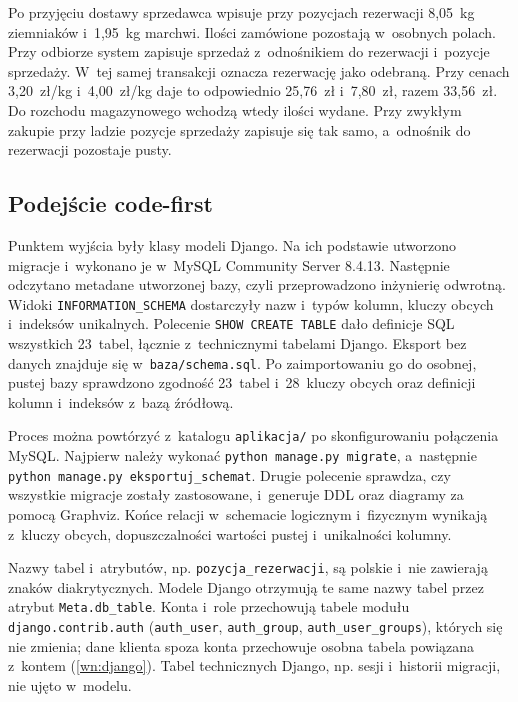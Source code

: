 \documentclass[12pt,a4paper,oneside]{article}
\newcounter{pu}
\begin{document}
Po przyjęciu dostawy sprzedawca wpisuje przy pozycjach rezerwacji 8,05~kg ziemniaków i~1,95~kg marchwi. Ilości zamówione pozostają w~osobnych polach. Przy odbiorze system zapisuje sprzedaż z~odnośnikiem do rezerwacji i~pozycje sprzedaży. W~tej samej transakcji oznacza rezerwację jako odebraną. Przy cenach 3,20~zł/kg i~4,00~zł/kg daje to odpowiednio 25,76~zł i~7,80~zł, razem 33,56~zł. Do rozchodu magazynowego wchodzą wtedy ilości wydane. Przy zwykłym zakupie przy ladzie pozycje sprzedaży zapisuje się tak samo, a~odnośnik do rezerwacji pozostaje pusty.

\subsection{Podejście code-first}
\label{sec:code-first}

Punktem wyjścia były klasy modeli Django. Na ich podstawie utworzono migracje i~wykonano je w~MySQL Community Server 8.4.13. Następnie odczytano metadane utworzonej bazy, czyli przeprowadzono inżynierię odwrotną. Widoki \texttt{INFORMATION\_SCHEMA} dostarczyły nazw i~typów kolumn, kluczy obcych i~indeksów unikalnych. Polecenie \texttt{SHOW CREATE TABLE} dało definicje SQL wszystkich 23~tabel, łącznie z~technicznymi tabelami Django. Eksport bez danych znajduje się w~\texttt{baza/schema.sql}. Po zaimportowaniu go do osobnej, pustej bazy sprawdzono zgodność 23~tabel i~28~kluczy obcych oraz definicji kolumn i~indeksów z~bazą źródłową.

Proces można powtórzyć z~katalogu \texttt{aplikacja/} po skonfigurowaniu połączenia MySQL. Najpierw należy wykonać \texttt{python manage.py migrate}, a~następnie \texttt{python manage.py eksportuj\_schemat}. Drugie polecenie sprawdza, czy wszystkie migracje zostały zastosowane, i~generuje DDL oraz diagramy za pomocą Graphviz. Końce relacji w~schemacie logicznym i~fizycznym wynikają z~kluczy obcych, dopuszczalności wartości pustej i~unikalności kolumny.

Nazwy tabel i~atrybutów, np. \texttt{pozycja\_\allowbreak{}rezerwacji}, są polskie i~nie zawierają znaków diakrytycznych. Modele Django otrzymują te same nazwy tabel przez atrybut \texttt{Meta.\allowbreak{}db\_\allowbreak{}table}. Konta i~role przechowują tabele modułu \texttt{django.\allowbreak contrib.\allowbreak auth} (\texttt{auth\_\allowbreak{}user}, \texttt{auth\_\allowbreak{}group}, \texttt{auth\_\allowbreak{}user\_\allowbreak{}groups}), których się nie zmienia; dane klienta spoza konta przechowuje osobna tabela powiązana z~kontem (\ref{wn:django}). Tabel technicznych Django, np. sesji i~historii migracji, nie ujęto w~modelu.
\end{document}
